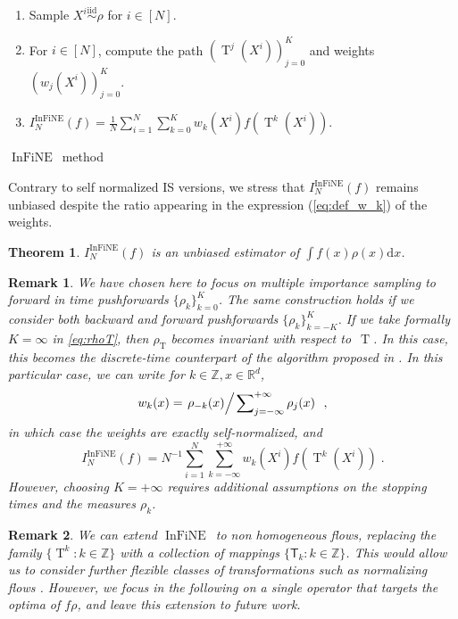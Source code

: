 \documentclass{article}
\newtheorem{theorem}{Theorem}
\newtheorem{remark}{Remark}
\def\IFIS{\ensuremath{\operatorname{InFiNE}}}
\def\transfo{\operatorname{T}}
\def\rmd{\operatorname{d}\hspace{-2pt}}
\def\rset{\mathbb{R}}
\def\rmd{\mathrm{d}}
\def\eqsp{\,}
\def\wrt{w.r.t.}
\def\eqsp{\;}
\newcommand{\1}{\mathds{1}}
\newcommand{\intentierU}[1]{[#1]}
\def\rset{\mathbb{R}}
\def\zset{\mathbb{Z}}
\def\rmd{\mathrm{d}}
\def\rhoT{\rho_{\transfo}}
\def\wrt{with respect to}
\begin{document}
\begin{algorithm}
\begin{enumerate}[wide, labelwidth=!, labelindent=0pt, label=(\arabic*)]
\item Sample $X^i \overset{\text{iid}}{\sim} \rho$ for $i\in[N]$.
\item For $i \in \intentierU{N}$, compute the
  path $(\transfo^j(X^i))_{j =0}^K$ and weights $(w_j(X^i))_{j =0}^K$.
\item$I^{\IFIS}_N(f) =   \tfrac{1}{N} \sum_{i=1}^N \sum_{k=0}^K w_k(X^i)  f(\transfo^k(X^i))$.
\end{enumerate}
\caption{\IFIS\ method}
\label{algo:IFIS}
\end{algorithm}
Contrary to self normalized IS versions, we stress that $I^{\IFIS}_N(f)$ remains unbiased despite the ratio appearing in the expression  (\ref{eq:def_w_k}) of the weights.
\begin{theorem}
\label{theo:importance-sampling}
$I^{\IFIS}_N(f)$ is an unbiased estimator of $\int f(x) \rho(x) \rmd x$.
\end{theorem}

\begin{remark}\em
\label{remark1}
We have chosen here to focus on multiple importance sampling to forward in time pushforwards $\{\rho_k\}_{k=0}^K$. The same construction holds if we consider both backward and forward pushforwards $\{\rho_k\}_{k=-K}^K$.
If we take formally $K=\infty$ in \eqref{eq:rhoT}, then $\rhoT$ becomes invariant \wrt\ $\transfo$. In this case, this becomes the discrete-time counterpart of the algorithm proposed in \cite{rotskoff:vanden-eijden:2019}.
In this particular case, we can write for $k\in\zset, x\in\rset^d$,
\[
 w_{k}(x) =  \left.  \rho_{-k}(x) \middle / \left. \sum\nolimits_{j=-\infty}^{+\infty} \rho_{j}(x) \right.\right. \eqsp,
\]
in which case the weights are exactly self-normalized, and
$$
I^{\IFIS}_N(f) =  N^{-1} \sum_{i=1}^N \sum_{k=-\infty}^{+\infty} w_k(X^i)  f(\transfo^k(X^i))\eqsp.
$$
However, choosing $K=+\infty$ requires additional assumptions on the stopping times and the measures $\rho_k$.
\end{remark}
\begin{remark}\em
We can extend \IFIS\ to non homogeneous flows, replacing the family $\{\transfo^k\colon k\in\zset\}$ with a collection of mappings $\{\mathsf{T}_k\colon k\in\zset\}$.
This would allow us to consider further flexible classes of transformations such as normalizing flows \cite{papamakarios2019normalizing}.
However, we focus in the following on a single operator that targets the optima of $f\rho$, and leave this extension to future work.
\end{remark}
\end{document}
